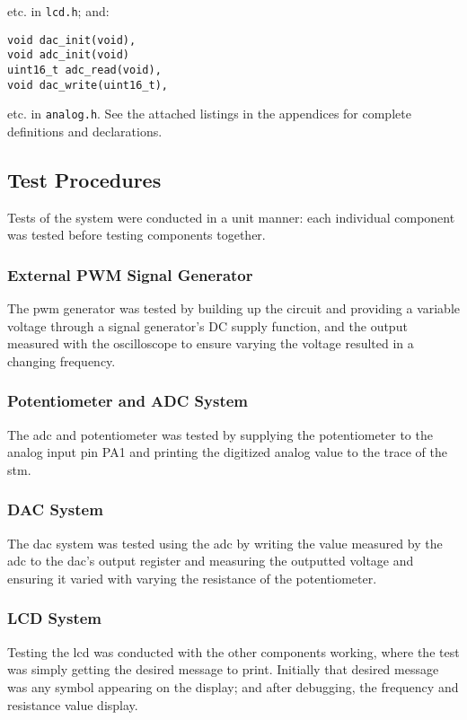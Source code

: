 etc. in \lstinline{lcd.h}; and:

\begin{lstlisting}[numbers=none]
void dac_init(void),
void adc_init(void)
uint16_t adc_read(void),
void dac_write(uint16_t),
\end{lstlisting}

etc. in \lstinline{analog.h}. See the attached listings in the
appendices for complete definitions and declarations.





\subsection{Test Procedures}
Tests of the system were conducted in a unit manner: each individual
component was tested before testing components together.
\subsubsection{External PWM Signal Generator}
The \gls{pwm} generator was tested by building up the circuit and
providing a variable voltage through a signal generator's DC supply
function, and the output measured with the oscilloscope to ensure
varying the voltage resulted in a changing frequency.

\subsubsection{Potentiometer and ADC System}
The \gls{adc} and potentiometer was tested by supplying the
potentiometer to the analog input pin PA1 and printing the digitized
analog value to the trace of the \gls{stm}.

\subsubsection{DAC System}
The \gls{dac} system was tested using the \gls{adc} by writing the value
measured by the \gls{adc} to the \gls{dac}'s output register and
measuring the outputted voltage and ensuring it varied with varying
the resistance of the potentiometer.

\subsubsection{LCD System}
Testing the \gls{lcd} was conducted with the other components working,
where the test was simply getting the desired message to print.
Initially that desired message was any symbol appearing on the display;
and after debugging, the frequency and resistance value display.

